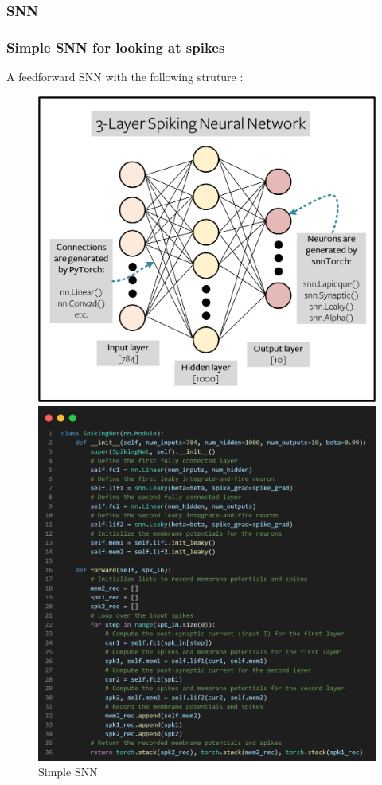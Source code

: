 \documentclass[11pt]{article}
\begin{document}
\subsubsection{SNN}

\subsubsection*{Simple SNN for looking at spikes}

A feedforward SNN with the following struture :
\begin{figure}[H]
  \begin{minipage}{0.4\textwidth}
    \centering
    \includegraphics[width=0.9\linewidth]{image/2_8_fcn.png}
    \caption{Simple SNN}
    \label{fig:simple_snn}
  \end{minipage}
  \begin{minipage}{0.5\textwidth}
    \centering
    \includegraphics[width=\linewidth]{image/2_8_fcn_code.png}

\end{minipage}
\end{figure}
\end{document}
